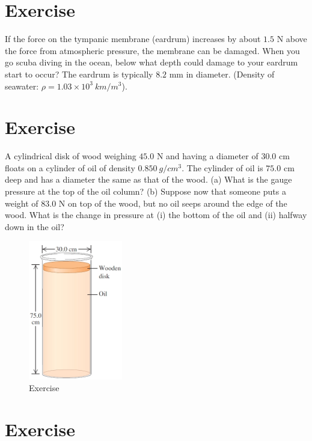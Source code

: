 \documentclass[12pt]{article}
\begin{document}
\section*{Exercise \theexample }

If the force on the
tympanic membrane (eardrum) increases by about $1.5$ N above the
force from atmospheric pressure, the membrane can be damaged.
When you go scuba diving in the ocean, below what depth could
damage to your eardrum start to occur? The eardrum is typically
$8.2$ mm in diameter. (Density of seawater: $\rho=1.03\times10^3~km/m^3$).

\section*{Exercise \theexample }


A cylindrical disk of
wood weighing $45.0$ N and having
a diameter of $30.0$ cm floats
on a cylinder of oil of density $0.850~g/cm^3$. The
cylinder of oil is $75.0$ cm deep
and has a diameter the same as
that of the wood. (a) What is the
gauge pressure at the top of the
oil column? (b) Suppose now
that someone puts a weight of
$83.0$ N on top of the wood, but
no oil seeps around the edge of
the wood. What is the change in
pressure at (i) the bottom of the
oil and (ii) halfway down in
the oil?



 \begin{figure}[h!]
   \begin{center}
     \includegraphics[height=2.4in]{images/figure1.jpg}
     \caption{Exercise \theexample }
     \label{1}
   \end{center}
 \end{figure}



 \section*{Exercise \theexample  }
\end{document}
